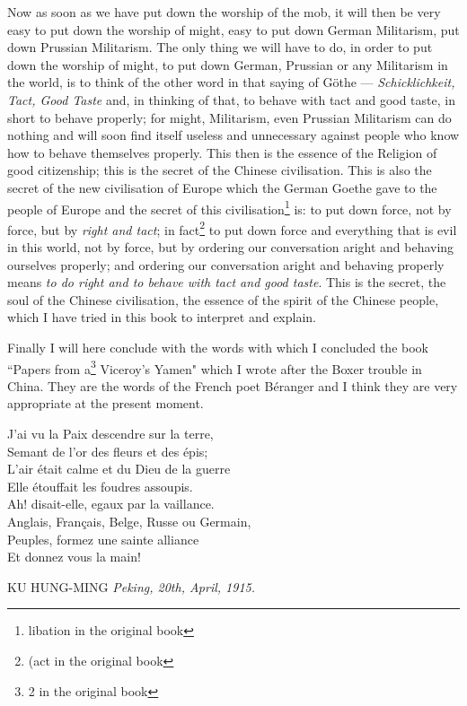 Now as soon as we have put down the worship of the mob, it will then be very easy to put down the worship of might, easy to put down German Militarism, put down Prussian Militarism.
The only thing we will have to do, in order to put down the worship of might, to put down German, Prussian or any Militarism in the world, is to think of the other word in that saying of G\"othe --- \emph{Schicklichkeit, Tact, Good Taste} and, in thinking of that, to behave with tact and good taste, in short to behave properly; for might, Militarism, even Prussian Militarism can do nothing and will soon find itself useless and unnecessary against people who know how to behave themselves properly.
This then is the essence of the Religion of good citizenship; this is the secret of the Chinese civilisation.
This is also the secret of the new civilisation of Europe which the German Goethe gave to the people of Europe and the secret of this civilisation\footnote{libation in the original book} is: to put down force, not by force, but by \emph{right and tact}; in fact\footnote{(act in the original book} to put down force and everything that is evil in this world, not by force, but by ordering our conversation aright and behaving ourselves properly; and ordering our conversation aright and behaving properly means \emph{to do right and to behave with tact and good taste}\cite{num10}. 
This is the secret, the soul of the Chinese civilisation, the essence of the spirit of the Chinese people, which I have tried in this book to interpret and explain.

Finally I will here conclude with the words with which I concluded the book ``Papers from a\footnote{2 in the original book} Viceroy's Yamen" which I wrote after the Boxer trouble in China.
They are the words of the French poet B\'eranger and I think they are very appropriate at the present moment.
\begin{center}
    J'ai vu la Paix descendre sur la terre,\\
    Semant de l'or des fleurs et des \'epis;\\
    L'air \'etait calme et du Dieu de la guerre\\
    Elle \'etouffait les foudres assoupis.\\
    Ah! disait-elle, egaux par la vaillance.\\
    Anglais, Fran\c{c}ais, Belge, Russe ou Germain,\\
    Peuples, formez une sainte alliance\\
    Et donnez vous la main!\\
\end{center}

\vspace{2cm}
\hfill KU HUNG-MING
\vspace{3cm}
\emph{Peking, 20th, April, 1915.}


